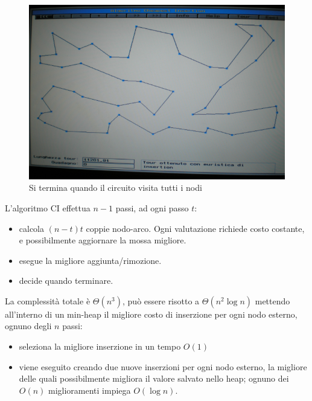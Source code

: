 \documentclass{article}
\begin{document}
    \begin{figure}[H]
        \centering
        \includegraphics[scale=0.5]{images/cheap_ins3.png}
        \caption{Si termina quando il circuito visita tutti i nodi}
    \end{figure}
    L'algoritmo CI effettua $n-1$ passi, ad ogni passo $t$:
    \begin{itemize}
        \item calcola $(n-t)t$ coppie nodo-arco. Ogni valutazione richiede costo costante, e possibilmente
              aggiornare la mossa migliore.
        \item esegue la migliore aggiunta/rimozione.
        \item decide quando terminare.
    \end{itemize}
    La complessità totale è $\Theta(n^3)$, può essere risotto a $\Theta(n^2\log n)$ mettendo all'interno di
    un min-heap il migliore costo di inserzione per ogni nodo esterno, ognuno degli $n$ passi:
    \begin{itemize}
        \item seleziona la migliore inserzione in un tempo $O(1)$
        \item viene eseguito creando due nuove inserzioni per ogni nodo esterno, la migliore delle
              quali possibilmente migliora il valore salvato nello heap; ognuno dei $O(n)$ miglioramenti
              impiega $O(\log n)$.
    \end{itemize}
\end{document}
